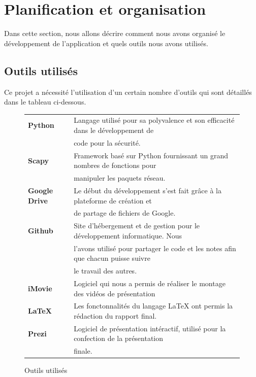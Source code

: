 \documentclass[11pt]{article}
\begin{document}
\section{Planification et organisation}
Dans cette section, nous allons décrire comment nous avons organisé le développement de l'application et quels outils nous avons utilisés.

\subsection{Outils utilisés}
Ce projet a nécessité l'utilisation d'un certain nombre d'outils qui sont détaillés dans le tableau ci-dessous.~\\
\begin{figure}[h]
\centering
\begin{tabular}{|l|l|}
\hline
   \textbf{Python} & Langage utilisé pour sa polyvalence et son efficacité dans le développement de  \\
    &code pour la sécurité. \\ \hline
    \textbf{Scapy} & Framework basé sur Python fournissant un grand nombres de fonctions pour  \\
    & manipuler les paquets réseau. \\ \hline
   \textbf{Google Drive} & Le début du développement s'est fait grâce à la plateforme de création et  \\
	& de partage de fichiers de Google. \\ \hline
\textbf{Github} & Site d'hébergement et de gestion pour le développement informatique. Nous \\ 
&   l'avons utilisé pour partager le code et les notes afin que chacun puisse suivre   \\
&  le travail des autres. \\ \hline
\textbf{iMovie} & Logiciel qui nous a permis de réaliser le montage des vidéos de présentation \\ \hline
\textbf{LaTeX} & Les fonctonnalités du langage LaTeX ont permis la rédaction du rapport final. \\ \hline
\textbf{Prezi} & Logiciel de présentation intéractif, utilisé pour la confection de la présentation \\
& finale.\\ \hline
\end{tabular}
\caption{Outils utilisés}
\end{figure}
\end{document}

